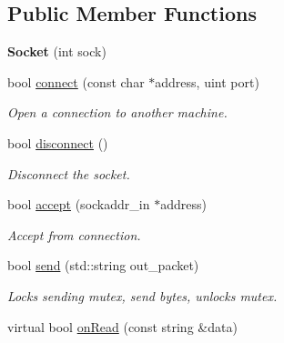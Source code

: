 \subsection*{Public Member Functions}
\begin{DoxyCompactItemize}
\item 
\hypertarget{classSocket_acba9bcb13219372b3236ebd45edc29fb}{
{\bfseries Socket} (int sock)}
\label{classSocket_acba9bcb13219372b3236ebd45edc29fb}

\item 
\hypertarget{classSocket_a3af2e8cbacea68672534fee333b1f676}{
bool \hyperlink{classSocket_a3af2e8cbacea68672534fee333b1f676}{connect} (const char $\ast$address, uint port)}
\label{classSocket_a3af2e8cbacea68672534fee333b1f676}

\begin{DoxyCompactList}\small\item\em Open a connection to another machine. \item\end{DoxyCompactList}\item 
\hypertarget{classSocket_af4e3f3b8001460ae2871f5374b70e3b8}{
bool \hyperlink{classSocket_af4e3f3b8001460ae2871f5374b70e3b8}{disconnect} ()}
\label{classSocket_af4e3f3b8001460ae2871f5374b70e3b8}

\begin{DoxyCompactList}\small\item\em Disconnect the socket. \item\end{DoxyCompactList}\item 
\hypertarget{classSocket_ab2acb0737506e2be16477b22ecec924f}{
bool \hyperlink{classSocket_ab2acb0737506e2be16477b22ecec924f}{accept} (sockaddr\_\-in $\ast$address)}
\label{classSocket_ab2acb0737506e2be16477b22ecec924f}

\begin{DoxyCompactList}\small\item\em Accept from connection. \item\end{DoxyCompactList}\item 
\hypertarget{classSocket_a633a2e7c9b017befb018d52688e3d79b}{
bool \hyperlink{classSocket_a633a2e7c9b017befb018d52688e3d79b}{send} (std::string out\_\-packet)}
\label{classSocket_a633a2e7c9b017befb018d52688e3d79b}

\begin{DoxyCompactList}\small\item\em Locks sending mutex, send bytes, unlocks mutex. \item\end{DoxyCompactList}\item 
\hypertarget{classSocket_a919d8108f9418f85fbeb4ec772b13c10}{
virtual bool \hyperlink{classSocket_a919d8108f9418f85fbeb4ec772b13c10}{onRead} (const string \&data)}
\label{classSocket_a919d8108f9418f85fbeb4ec772b13c10}


\end{DoxyCompactItemize}
